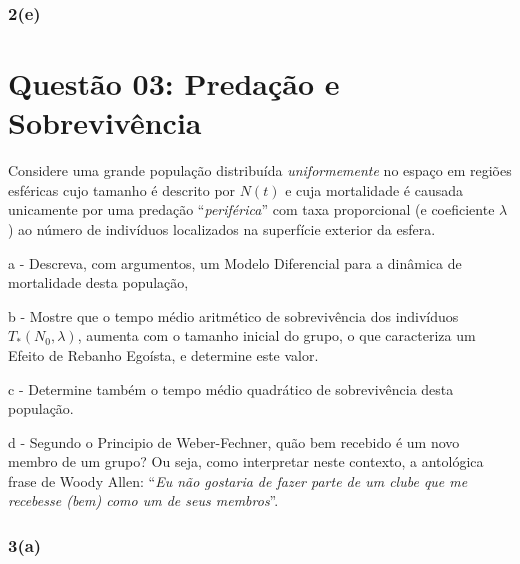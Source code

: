 \subsection*{2(e)}




\clearpage
\chapter*{Questão 03: Predação e Sobrevivência}

Considere uma grande população distribuída \textit{uniformemente} no espaço em regiões esféricas cujo tamanho é descrito por $N(t)$ e cuja mortalidade é causada unicamente por uma predação ``\textit{periférica}'' com taxa proporcional (e coeficiente \(\lambda\)) ao número de indivíduos localizados na superfície exterior da esfera.

\begin{description}
\item a - Descreva, com argumentos, um Modelo Diferencial para a dinâmica de mortalidade desta população,
\item b - Mostre que o tempo médio aritmético de sobrevivência dos indivíduos $T_\ast(N_0, \lambda)$, aumenta com o tamanho inicial do grupo, o que caracteriza um Efeito de Rebanho Egoísta, e determine este valor.

\item c - Determine também o tempo médio quadrático de sobrevivência desta população.

\item d - Segundo o Principio de Weber-Fechner, quão bem recebido é um novo membro de um grupo? Ou seja, como interpretar neste contexto, a antológica frase de Woody Allen: ``{\em Eu não gostaria de fazer parte de um clube que me recebesse (bem) como um de seus membros}''.
\end{description}



\subsection*{3(a)}

